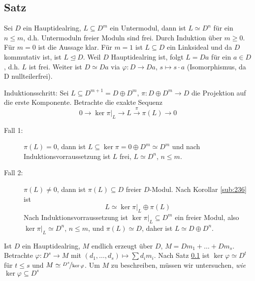 \subsection[Satz: Für $R$ HIR sind Untermoduln freier $R$-Moduln frei]{Satz} %
\label{sub:242}
Sei $D$ ein Hauptidealring, $L \subseteq D^m$ ein Untermodul, dann ist $L \simeq D^n$ für ein $n \le m$, d.h. Untermoduln freier Moduln sind frei.
Durch Induktion über $m \ge 0$. Für $m=0$ ist die Aussage klar. Für $m=1$ ist $L \subseteq D$ ein Linksideal und da $D$ kommutativ ist, ist $L \unlhd D$. Weil $D$
Hauptidealring ist, folgt $L=D a$ für ein $a \in D$, d.h. $L$ ist frei. Weiter ist $D \simeq D a$ via $\varphi : D \to D a$, $s \mapsto s \cdot a$ (Isomorphismus, da D
nullteilerfrei).

Induktionsschritt: Sei $L \subseteq D^{m+1} = D \oplus D^m$, $\pi  : D \oplus D^m \to D$ die Projektion auf die erste Komponente. Betrachte die exakte Sequenz
\[
	0 \to \ker \pi\big|_L \to L \xrightarrow{\pi} \pi(L) \to 0 
\]
\begin{description}
	\item[Fall 1:] $\pi (L)=0$, dann ist $L \subseteq \ker \pi = 0 \oplus D^m \simeq D^m$ und nach Induktionsvorraussetzung ist $L$ frei, $L \simeq D^n$, $n \le m$.
	\item[Fall 2:] $\pi (L) \not= 0$, dann ist $\pi(L) \subseteq D$ freier $D$-Modul. Nach Korollar \ref{sub:236} ist 
	\[
		L \simeq \ker \pi\big|_L \oplus \pi(L)
	\]
	Nach Induktionsvorraussetzung ist $\ker \pi\big|_L \subseteq D^m$ ein freier Modul, also $\ker \pi\big|_L \simeq D^n$, $n \le m$, und $\pi (L) \simeq D$, daher ist 
	$L \simeq D \oplus D^n$. \bewende
\end{description}
	Ist $D$ ein Hauptidealring, $M$ endlich erzeugt über $D$, $M = D m_1 + \ldots + D m_s$. Betrachte $\varphi : D^s \to M$ mit $(d_1, \ldots , d_s) \mapsto \sum d_i m_i$.
	Nach Satz \ref{sub:242} ist $\ker \varphi \simeq D^t$ für $t \le s$ und $M \simeq \nicefrac{D^s}{\ker \varphi}$. Um $M$ zu beschreiben, müssen wir untersuchen, 
	\emph{wie} $\ker \varphi \subseteq D^s$

